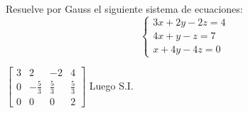 \documentclass[addpoints,spanish, 12pt,a4paper]{exam}
\begin{document}
\begin{questions}

\question[2] Resuelve por Gauss el siguiente sistema de ecuaciones:
\[
\begin{cases}
3x + 2y - 2z = 4 \\
4x + y - z = 7 \\
x + 4y - 4z = 0
\end{cases}
\]

\begin{solution}
$\left[\begin{matrix}3 & 2 & -2 & 4\\0 & - \frac{5}{3} & \frac{5}{3} & \frac{5}{3}\\0 & 0 & 0 & 2\end{matrix}\right]$ Luego S.I.
\end{solution}





\end{questions}
\end{document}
